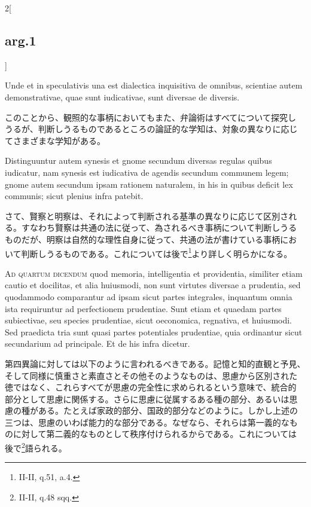 \documentclass[paper=a4paper,fontsize=10pt,jafontsize=9pt,titlepage]{jlreq}
\begin{document}
\begin{paracol}{2}[\subsection{arg.1}]
\switchcolumn*

Unde et in speculativis una est dialectica inquisitiva de omnibus,
scientiae autem demonstrativae, quae sunt iudicativae, sunt diversae
de diversis.

\switchcolumn

このことから、観照的な事柄においてもまた、弁論術はすべてについて探究し
うるが、判断しうるものであるところの論証的な学知は、対象の異なりに応じ
てさまざまな学知がある。

\switchcolumn*

Distinguuntur autem synesis et gnome secundum diversas regulas quibus
iudicatur, nam synesis est iudicativa de agendis secundum communem
legem; gnome autem secundum ipsam rationem naturalem, in his in quibus
deficit lex communis; sicut plenius infra patebit.

\switchcolumn

さて、賢察と明察は、それによって判断される基準の異なりに応じて区別され
る。すなわち賢察は共通の法に従って、為されるべき事柄について判断しうる
ものだが、明察は自然的な理性自身に従って、共通の法が書けている事柄にお
いて判断しうるものである。これについては後で\footnote{II-II, q.51,
a.4.}より詳しく明らかになる。

\switchcolumn*[\subsection{ad.4}]

{\scshape Ad quartum dicendum} quod memoria, intelligentia et
providentia, similiter etiam cautio et docilitas, et alia huiusmodi,
non sunt virtutes diversae a prudentia, sed quodammodo comparantur ad
ipsam sicut partes integrales, inquantum omnia ista requiruntur ad
perfectionem prudentiae. Sunt etiam et quaedam partes subiectivae, seu
species prudentiae, sicut oeconomica, regnativa, et huiusmodi. Sed
praedicta tria sunt quasi partes potentiales prudentiae, quia
ordinantur sicut secundarium ad principale. Et de his infra dicetur.

\switchcolumn

第四異論に対しては以下のように言われるべきである。記憶と知的直観と予見、
そして同様に慎重さと素直さとその他そのようなものは、思慮から区別された
徳ではなく、これらすべてが思慮の完全性に求められるという意味で、統合的
部分として思慮に関係する。さらに思慮に従属するある種の部分、あるいは思
慮の種がある。たとえば家政的部分、国政的部分などのように。しかし上述の
三つは、思慮のいわば能力的な部分である。なぜなら、それらは第一義的なも
のに対して第二義的なものとして秩序付けられるからである。これについては
後で\footnote{II-II, q.48 sqq.}語られる。

\end{paracol}
\end{document}
